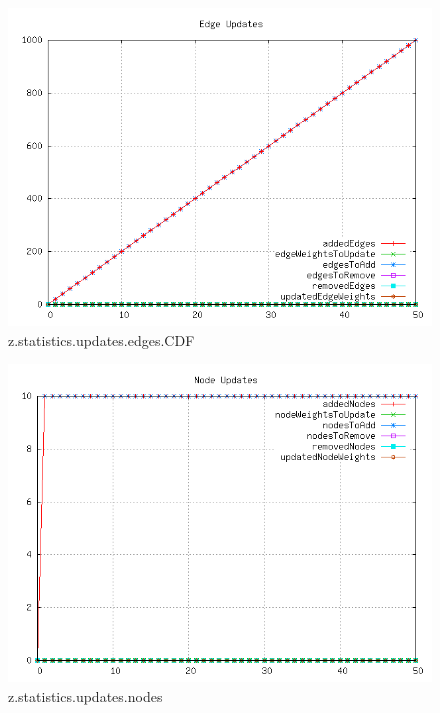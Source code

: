 \begin{figure} [h]
	\centering
	\includegraphics [scale=0.8] {plots/z.statistics.updates.edges.CDF}
	\caption{z.statistics.updates.edges.CDF}
	\label{plot:RANDOM_100_500 - BARABASI_ALBERT_GROWTH_10_2.z.statistics.updates.edges.CDF}
\end{figure}

\begin{figure} [h]
	\centering
	\includegraphics [scale=0.8] {plots/z.statistics.updates.nodes}
	\caption{z.statistics.updates.nodes}
	\label{plot:RANDOM_100_500 - BARABASI_ALBERT_GROWTH_10_2.z.statistics.updates.nodes}
\end{figure}

